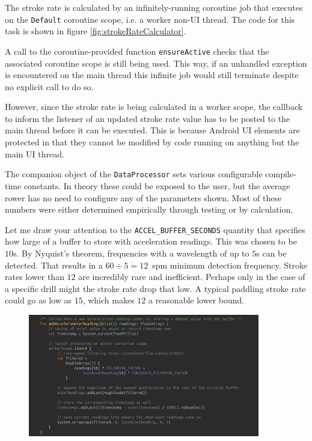 \documentclass[11pt,twoside,a4paper]{report}
\begin{document}
The stroke rate is calculated by an infinitely-running coroutine job that executes on the \texttt{Default} coroutine scope, i.e. a worker non-UI thread. The code for this task is shown in figure \ref{fig:strokeRateCalculator}. 

A call to the coroutine-provided function \texttt{ensureActive} checks that the associated coroutine scope is still being used. This way, if an unhandled exception is encountered on the main thread this infinite job would still terminate despite no explicit call to do so.

However, since the stroke rate is being calculated in a worker scope, the callback to inform the listener of an updated stroke rate value has to be posted to the main thread before it can be executed. This is because Android UI elements are protected in that they cannot be modified by code running on anything but the main UI thread.

The companion object of the \texttt{DataProcessor} sets various configurable compile-time constants. In theory these could be exposed to the user, but the average rower has no need to configure any of the parameters shown. Most of these numbers were either determined empirically through testing or by calculation.

Let me draw your attention to the \texttt{ACCEL\_BUFFER\_SECONDS} quantity that specifies how large of a buffer to store with acceleration readings. This was chosen to be $10$\si{\second}. By Nyquist's theorem, frequencies with a wavelength of up to $5$\si{\second} can be detected. That results in a $60 \div 5 = 12$~spm minimum detection frequency. Stroke rates lower than $12$ are incredibly rare and inefficient. Perhaps only in the case of a specific drill might the stroke rate drop that low. A typical paddling stroke rate could go as low as $15$, which makes $12$ a reasonable lower bound.

\begin{figure}[h!]
  \centering
  \includegraphics[width=0.9\textwidth]{code-dp-addAccelReading.png}
  \caption{}
  \label{fig:addAccelerometerReading}
\end{figure}
\end{document}
